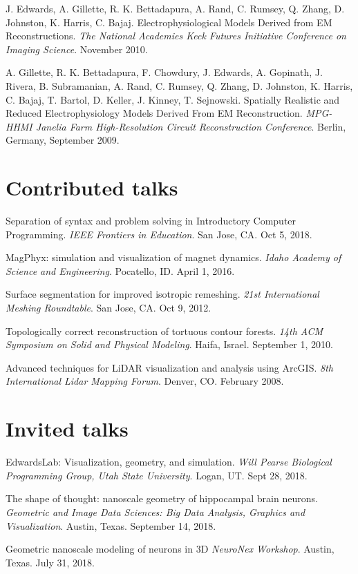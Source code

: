 \documentclass[margin,line]{res}
\begin{document}
\begin{resume}
\begin{LONG}
J. Edwards, A. Gillette, R. K. Bettadapura, A. Rand, C. Rumsey, Q. Zhang, D. Johnston, K. Harris, C. Bajaj. 
Electrophysiological Models Derived from EM Reconstructions. 
\textit{The National Academies Keck Futures Initiative Conference on Imaging Science}. November 2010.

A. Gillette, R. K. Bettadapura, F. Chowdury, J. Edwards, A. Gopinath, J. Rivera, B. Subramanian, A. Rand, C. Rumsey, Q. Zhang, D. Johnston, K. Harris, C. Bajaj, T. Bartol, D. Keller, J. Kinney, T. Sejnowski. 
Spatially Realistic and Reduced Electrophysiology Models Derived From EM Reconstruction. 
\textit{MPG-HHMI Janelia Farm High-Resolution Circuit Reconstruction Conference}. Berlin, Germany, September 2009.


\section{\sc Contributed talks}
Separation of syntax and problem solving in Introductory Computer Programming.
\textit{IEEE Frontiers in Education}. San Jose, CA. Oct 5, 2018.

MagPhyx: simulation and visualization of magnet dynamics.
\textit{Idaho Academy of Science and Engineering}. Pocatello, ID. April 1, 2016.

Surface segmentation for improved isotropic remeshing.
\textit{21st International Meshing Roundtable}. San Jose, CA. Oct 9, 2012.

Topologically correct reconstruction of tortuous contour forests.
\textit{14th ACM Symposium on Solid and Physical Modeling}. Haifa, Israel. September 1, 2010.

Advanced techniques for LiDAR visualization and analysis using ArcGIS.
\textit{8th International Lidar Mapping Forum}. Denver, CO. February 2008.


\section{\sc Invited talks}
EdwardsLab: Visualization, geometry, and simulation.
\textit{Will Pearse Biological Programming Group, Utah State University}. Logan, UT. Sept 28, 2018.

The shape of thought: nanoscale geometry of hippocampal brain neurons.
\textit{Geometric and Image Data Sciences: Big Data Analysis, Graphics and Visualization}. Austin, Texas. September 14, 2018.

Geometric nanoscale modeling of neurons in 3D
\textit{NeuroNex Workshop}. Austin, Texas. July 31, 2018.


\end{LONG}
\end{resume}
\end{document}
